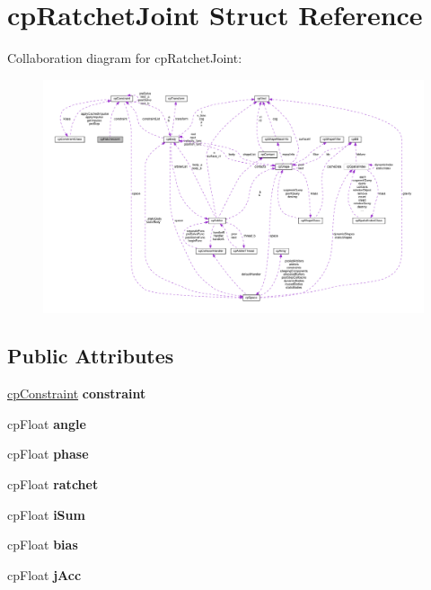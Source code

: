 \hypertarget{structcpRatchetJoint}{}\section{cp\+Ratchet\+Joint Struct Reference}
\label{structcpRatchetJoint}


Collaboration diagram for cp\+Ratchet\+Joint\+:
\nopagebreak
\begin{figure}[H]
\begin{center}
\leavevmode
\includegraphics[width=350pt]{structcpRatchetJoint__coll__graph}
\end{center}
\end{figure}
\subsection*{Public Attributes}
\begin{DoxyCompactItemize}
\item 
\mbox{\label{structcpRatchetJoint_af9d8bbe16647cdd22ac11cc62c159ec6}} 
\hyperlink{structcpConstraint}{cp\+Constraint} {\bfseries constraint}
\item 
\mbox{\label{structcpRatchetJoint_ad59adcecd4f37a4f852e061fab6f6f73}} 
cp\+Float {\bfseries angle}
\item 
\mbox{\label{structcpRatchetJoint_a331d7a3810f61fdb2c8460157c8f4ff1}} 
cp\+Float {\bfseries phase}
\item 
\mbox{\label{structcpRatchetJoint_a0eec70ed3e1e8ef260e8a008ab3fb5a6}} 
cp\+Float {\bfseries ratchet}
\item 
\mbox{\label{structcpRatchetJoint_a11e3d08ea918cc5a9b7434d79b83e329}} 
cp\+Float {\bfseries i\+Sum}
\item 
\mbox{\label{structcpRatchetJoint_a5560e06a4fa4e0ad50a9be0df9bf03d6}} 
cp\+Float {\bfseries bias}
\item 
\mbox{\label{structcpRatchetJoint_a26d63236a02cf6622ebc256db530b578}} 
cp\+Float {\bfseries j\+Acc}
\end{DoxyCompactItemize}


